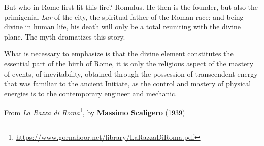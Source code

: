 But who in Rome first lit this fire? Romulus. He then is the founder, but also the primigenial \emph{Lar} of the city, the spiritual father of the Roman race: and being divine in human life, his death will only be a total reuniting with the divine plane. The myth dramatizes this story.

What is necessary to emphasize is that the divine element constitutes the essential part of the birth of Rome, it is only the religious aspect of the mastery of events, of inevitability, obtained through the possession of transcendent energy that was familiar to the ancient Initiate, as the control and mastery of physical energies is to the contemporary engineer and mechanic.

\begin{quotex}
From \textit{La Razza di Roma}\footnote{\url{https://www.gornahoor.net/library/LaRazzaDiRoma.pdf}}, by \textbf{Massimo Scaligero} (1939)
\end{quotex}


